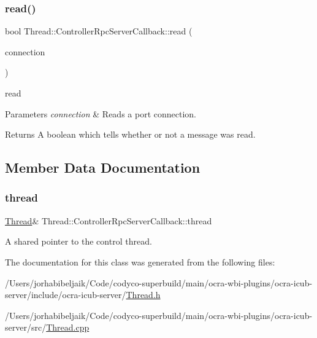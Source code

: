 \subsubsection{\texorpdfstring{read()}{read()}}
{\footnotesize\ttfamily bool Thread\+::\+Controller\+Rpc\+Server\+Callback\+::read (\begin{DoxyParamCaption}\item[{yarp\+::os\+::\+Connection\+Reader \&}]{connection }\end{DoxyParamCaption})\hspace{0.3cm}{\ttfamily [virtual]}}

read 
\begin{DoxyParams}{Parameters}
{\em connection} & Reads a port connection.\\
\hline
\end{DoxyParams}
\begin{DoxyReturn}{Returns}
A boolean which tells whether or not a message was read. 
\end{DoxyReturn}


\subsection{Member Data Documentation}
\hypertarget{classThread_1_1ControllerRpcServerCallback_a466f100742fdac49e0016ec2f0c43536}{}\label{classThread_1_1ControllerRpcServerCallback_a466f100742fdac49e0016ec2f0c43536} 
\subsubsection{\texorpdfstring{thread}{thread}}
{\footnotesize\ttfamily \hyperlink{classThread}{Thread}\& Thread\+::\+Controller\+Rpc\+Server\+Callback\+::thread\hspace{0.3cm}{\ttfamily [private]}}

A shared pointer to the control thread. 

The documentation for this class was generated from the following files\+:\begin{DoxyCompactItemize}
\item 
/\+Users/jorhabibeljaik/\+Code/codyco-\/superbuild/main/ocra-\/wbi-\/plugins/ocra-\/icub-\/server/include/ocra-\/icub-\/server/\hyperlink{Thread_8h}{Thread.\+h}\item 
/\+Users/jorhabibeljaik/\+Code/codyco-\/superbuild/main/ocra-\/wbi-\/plugins/ocra-\/icub-\/server/src/\hyperlink{Thread_8cpp}{Thread.\+cpp}\end{DoxyCompactItemize}
